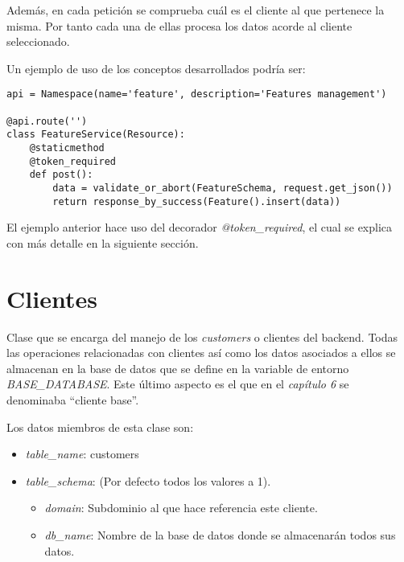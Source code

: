 Además, en cada petición se comprueba cuál es el cliente al que pertenece la misma. Por tanto cada una de ellas procesa los datos acorde al cliente seleccionado.

\smallskip
Un ejemplo de uso de los conceptos desarrollados podría ser:
\begin{lstlisting}
api = Namespace(name='feature', description='Features management')

@api.route('')
class FeatureService(Resource):
	@staticmethod
	@token_required
	def post():
		data = validate_or_abort(FeatureSchema, request.get_json())
		return response_by_success(Feature().insert(data))
\end{lstlisting}

El ejemplo anterior hace uso del decorador \textit{@token\_required}, el cual se explica con más detalle en la siguiente sección.

\section{Clientes}

Clase que se encarga del manejo de los \textit{customers} o clientes del backend. Todas las operaciones relacionadas con clientes así como los datos asociados a ellos se almacenan en la base de datos que se define en la variable de entorno \textit{BASE\_DATABASE}. Este último aspecto es el que en el \textit{capítulo 6} se denominaba ``cliente base''.

\bigskip
Los datos miembros de esta clase son:
\begin{itemize}
	\item \textit{table\_name}: customers
	\item \textit{table\_schema}: (Por defecto todos los valores a 1).
	\begin{itemize}
		\item \textit{domain}: Subdominio al que hace referencia este cliente.
		\item \textit{db\_name}: Nombre de la base de datos donde se almacenarán todos sus datos.
	\end{itemize}
\end{itemize}


